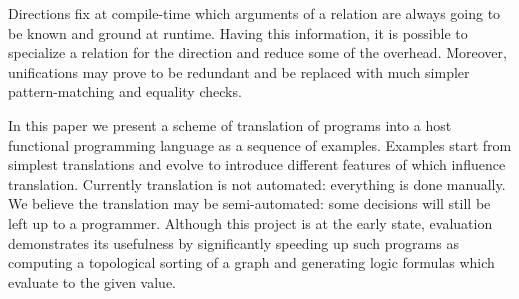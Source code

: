 Directions fix at compile-time which arguments of a relation are always going to be known and ground at runtime.
Having this information, it is possible to specialize a relation for the direction  and reduce some of the overhead.
Moreover, unifications may prove to be redundant and be replaced with much simpler pattern-matching and equality checks.

In this paper we present a scheme of translation of \mk programs into a host functional programming language as a sequence of examples.
Examples start from simplest translations and evolve to introduce different features of \mk which influence translation.
Currently translation is not automated: everything is done manually.
We believe the translation may be semi-automated: some decisions will still be left up to a programmer.
Although this project is at the early state, evaluation demonstrates its usefulness by significantly speeding up such programs as computing a topological sorting of a graph and generating logic formulas which evaluate to the given value.



